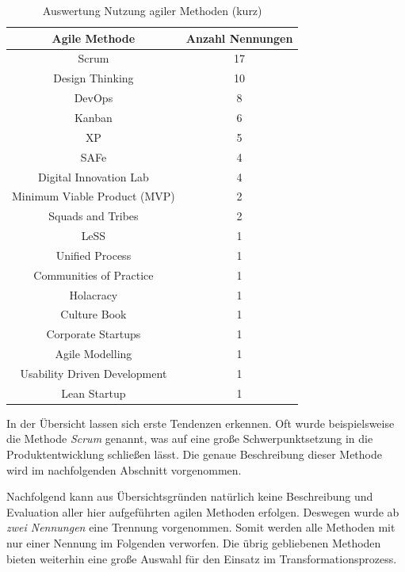 \begin{table}[ht]
	\centering
	\caption{Auswertung Nutzung agiler Methoden (kurz)}
	\begin{tabular}{|c|c|}
		\hline
		\textbf{Agile Methode}& \textbf{Anzahl Nennungen} \\
		\hline
		Scrum                          & 17               \\
		Design Thinking                & 10               \\
		DevOps                         & 8                \\
		Kanban                         & 6                \\
		XP                             & 5                \\
		SAFe                           & 4                \\
		Digital Innovation Lab         & 4                \\
		Minimum Viable Product (MVP) & 2                \\
		Squads and Tribes              & 2                \\
		LeSS                           & 1                \\
		Unified Process                & 1                \\
		Communities of Practice        & 1                \\
		Holacracy                      & 1                \\
		Culture Book                   & 1                \\
		Corporate Startups             & 1                \\
		Agile Modelling                & 1                \\
		Usability Driven Development   & 1                \\
		Lean Startup                   & 1               \\
		\hline
	\end{tabular}
	\label{tab:clusteringagileshort}
\end{table}

In der Übersicht lassen sich erste Tendenzen erkennen. Oft wurde beispielsweise die Methode \textit{Scrum} genannt, was auf eine große Schwerpunktsetzung in die Produktentwicklung schließen lässt. Die genaue Beschreibung dieser Methode wird im nachfolgenden Abschnitt vorgenommen. 

Nachfolgend kann aus Übersichtsgründen natürlich keine Beschreibung und Evaluation aller hier aufgeführten agilen Methoden erfolgen. Deswegen wurde ab \textit{zwei Nennungen} eine Trennung vorgenommen. Somit werden alle Methoden mit nur einer Nennung im Folgenden verworfen. Die übrig gebliebenen Methoden bieten weiterhin eine große Auswahl für den Einsatz im Transformationsprozess. 

